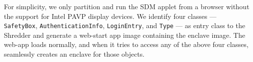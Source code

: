 For simplicity, we only partition and run the SDM applet from a browser without the support for Intel PAVP display devices. We identify four classes --- {\tt SafetyBox}, 
{\tt AuthenticationInfo}, {\tt LoginEntry}, and {\tt Type} --- as entry class to the Shredder and generate a web-start app image containing the enclave image. The web-app loads normally, and when it tries to access any of the above four classes, \sysname{} seamlessly creates an enclave for those objects. 


